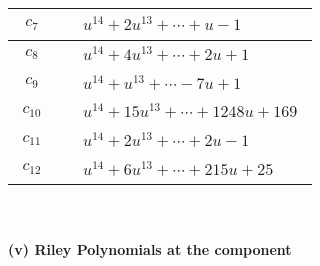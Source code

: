 \documentclass[1p]{elsarticle_modified}
\theoremstyle{definition}
\begin{document}
\begin{tabular}{m{50pt}|m{274pt}}
\hline $$\begin{aligned}c_{7}\end{aligned}$$&$\begin{aligned}
&u^{14}+2 u^{13}+\cdots+u-1
\end{aligned}$\\
\hline $$\begin{aligned}c_{8}\end{aligned}$$&$\begin{aligned}
&u^{14}+4 u^{13}+\cdots+2 u+1
\end{aligned}$\\
\hline $$\begin{aligned}c_{9}\end{aligned}$$&$\begin{aligned}
&u^{14}+u^{13}+\cdots-7 u+1
\end{aligned}$\\
\hline $$\begin{aligned}c_{10}\end{aligned}$$&$\begin{aligned}
&u^{14}+15 u^{13}+\cdots+1248 u+169
\end{aligned}$\\
\hline $$\begin{aligned}c_{11}\end{aligned}$$&$\begin{aligned}
&u^{14}+2 u^{13}+\cdots+2 u-1
\end{aligned}$\\
\hline $$\begin{aligned}c_{12}\end{aligned}$$&$\begin{aligned}
&u^{14}+6 u^{13}+\cdots+215 u+25
\end{aligned}$\\
\hline
\end{tabular}\\~\\
\newpage\renewcommand{\arraystretch}{1}
\flushleft \textbf{(v) Riley Polynomials at the component}\newline \\
\end{document}
